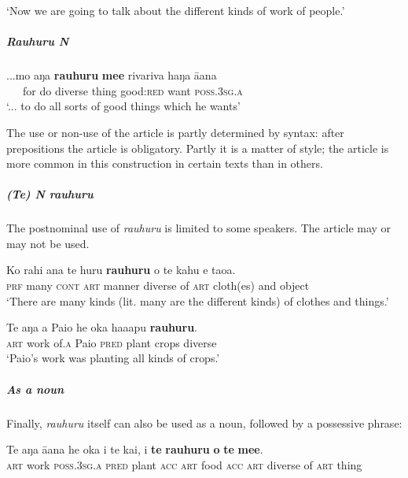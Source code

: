 \glt 
‘Now we are going to talk about the different kinds of work of people.’ \textstyleExampleref{[R334.203]} 
\z

\subparagraph{\textit{Rauhuru N}}

\ea\label{ex:4.73}
\gll ...mo aŋa \textbf{rauhuru} \textbf{me{\ꞌ}e} rivariva haŋa {\ꞌ}ā{\ꞌ}ana \\
~~~for do diverse thing good:\textsc{red} want \textsc{poss.3sg.a} \\

\glt
‘... to do all sorts of good things which he wants’ \textstyleExampleref{[2 Tim. 3:17]}
\z

The use or non-use of the article is partly determined by syntax: after prepositions the article is obligatory. Partly it is a matter of style; the article is more common in this construction in certain texts than in others. 

\subparagraph{\textit{(Te) N rauhuru}} The postnominal use of \textit{rauhuru} is limited to some speakers. The article may or may not be used.

\ea\label{ex:4.74}
\gll Ko rahi {\ꞌ}ana te huru \textbf{rauhuru} o te kahu {\ꞌ}e tao{\ꞌ}a. \\
\textsc{prf} many \textsc{cont} \textsc{art} manner diverse of \textsc{art} cloth(es) and object \\

\glt 
‘There are many kinds (lit. many are the different kinds) of clothes and things.’ \textstyleExampleref{[R539-2.28]}
\z

\ea\label{ex:4.75}
\gll Te aŋa {\ꞌ}a Paio he {\ꞌ}oka ha{\ꞌ}a{\ꞌ}apu \textbf{rauhuru}. \\
\textsc{art} work of\textsc{.a} Paio \textsc{pred} plant crops diverse \\

\glt 
‘Paio’s work was planting all kinds of crops.’ \textstyleExampleref{[R439.005]} 
\z

\subparagraph{As a noun} Finally, \textit{rauhuru} itself can also be used as a noun, followed by a possessive phrase:

\ea\label{ex:4.76}
\gll Te aŋa {\ꞌ}ā{\ꞌ}ana he {\ꞌ}oka i te kai, i \textbf{te} \textbf{rauhuru} \textbf{o} \textbf{te} \textbf{me{\ꞌ}e}. \\
\textsc{art} work \textsc{poss.3sg.a} \textsc{pred} plant \textsc{acc} \textsc{art} food \textsc{acc} \textsc{art} diverse of \textsc{art} thing \\

